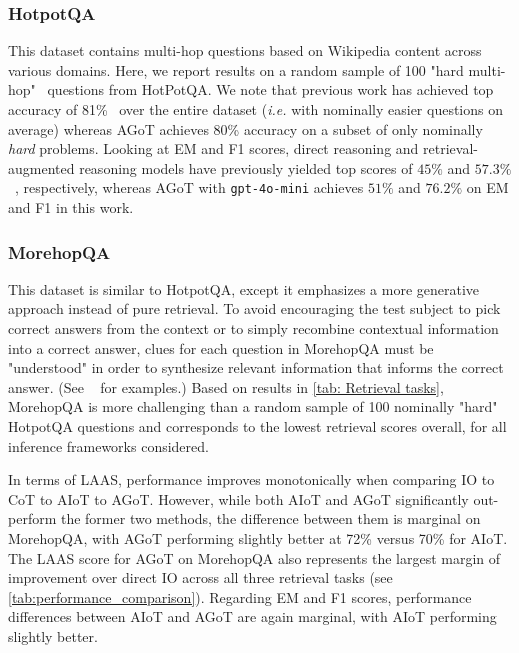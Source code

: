 \documentclass{article}
\begin{document}
\subsubsection{HotpotQA}
This dataset contains multi-hop questions based on Wikipedia content across various domains. Here, we report results on a random sample of 100 "hard multi-hop"~\citep{yang2018hotpotqadatasetdiverseexplainable} questions from HotPotQA. We note that previous work has achieved top accuracy of 81\%~\citep{gao2024metareasoninglargelanguage} over the entire dataset (\textit{i.e.} with nominally easier questions on average) whereas AGoT achieves 80\% accuracy on a subset of only nominally \textit{hard} problems. Looking at EM and F1 scores, direct reasoning and retrieval-augmented reasoning models have previously yielded top scores of $45\%$ and $57.3\%$~\citep{li2025searcho1agenticsearchenhancedlarge}, respectively, whereas AGoT with \texttt{gpt-4o-mini} achieves $51\%$ and $76.2\%$ on EM and F1 in this work.

\subsubsection{MorehopQA}
This dataset is similar to HotpotQA, except it emphasizes a more generative approach instead of pure retrieval. To avoid encouraging the test subject to pick correct answers from the context or to simply recombine contextual information into a correct answer, clues for each question in MorehopQA must be "understood" in order to synthesize relevant information that informs the correct answer. (See  ~\citet{schnitzler2024morehopqamultihopreasoning} for examples.) Based on results in \autoref{tab: Retrieval tasks}, MorehopQA is more challenging than a random sample of 100 nominally "hard" HotpotQA questions and corresponds to the lowest retrieval scores overall, for all inference frameworks considered.

In terms of LAAS, performance improves monotonically when comparing IO to CoT to AIoT to AGoT. However, while both AIoT and AGoT significantly out-perform the former two methods, the difference between them is marginal on MorehopQA, with AGoT performing slightly better at 72\% versus 70\% for AIoT. The LAAS score for AGoT on MorehopQA also represents the largest margin of improvement over direct IO across all three retrieval tasks (see \autoref{tab:performance_comparison}). Regarding EM and F1 scores, performance differences between AIoT and AGoT are again marginal, with AIoT performing slightly better.
\end{document}
